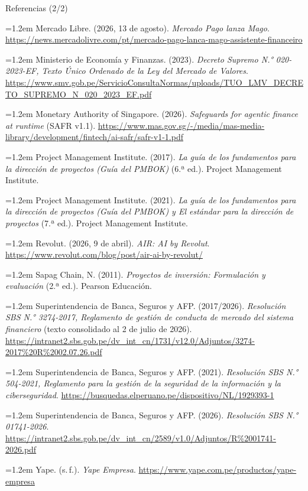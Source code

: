 \documentclass[aspectratio=169,11pt]{beamer}
\begin{document}
\begin{frame}{Referencias (2/2)}
\vspace{-0.05cm}
\tiny
\setlength{\parskip}{0.35em}
\raggedright
\hangindent=1.2em Mercado Libre. (2026, 13 de agosto). \textit{Mercado Pago lanza Mago}. \url{https://news.mercadolivre.com/pt/mercado-pago-lanca-mago-assistente-financeiro}\par
\hangindent=1.2em Ministerio de Economía y Finanzas. (2023). \textit{Decreto Supremo N.° 020-2023-EF, Texto Único Ordenado de la Ley del Mercado de Valores}. \url{https://www.smv.gob.pe/ServicioConsultaNormas/uploads/TUO_LMV_DECRETO_SUPREMO_N_020_2023_EF.pdf}\par
\hangindent=1.2em Monetary Authority of Singapore. (2026). \textit{Safeguards for agentic finance at runtime} (SAFR v1.1). \url{https://www.mas.gov.sg/-/media/mas-media-library/development/fintech/ai-safr/safr-v1-1.pdf}\par
\hangindent=1.2em Project Management Institute. (2017). \textit{La guía de los fundamentos para la dirección de proyectos (Guía del PMBOK)} (6.ª ed.). Project Management Institute.\par
\hangindent=1.2em Project Management Institute. (2021). \textit{La guía de los fundamentos para la dirección de proyectos (Guía del PMBOK) y El estándar para la dirección de proyectos} (7.ª ed.). Project Management Institute.\par
\hangindent=1.2em Revolut. (2026, 9 de abril). \textit{AIR: AI by Revolut}. \url{https://www.revolut.com/blog/post/air-ai-by-revolut/}\par
\hangindent=1.2em Sapag Chain, N. (2011). \textit{Proyectos de inversión: Formulación y evaluación} (2.ª ed.). Pearson Educación.\par
\hangindent=1.2em Superintendencia de Banca, Seguros y AFP. (2017/2026). \textit{Resolución SBS N.° 3274-2017, Reglamento de gestión de conducta de mercado del sistema financiero} (texto consolidado al 2 de julio de 2026). \url{https://intranet2.sbs.gob.pe/dv_int_cn/1731/v12.0/Adjuntos/3274-2017\%20R\%2002.07.26.pdf}\par
\hangindent=1.2em Superintendencia de Banca, Seguros y AFP. (2021). \textit{Resolución SBS N.° 504-2021, Reglamento para la gestión de la seguridad de la información y la ciberseguridad}. \url{https://busquedas.elperuano.pe/dispositivo/NL/1929393-1}\par
\hangindent=1.2em Superintendencia de Banca, Seguros y AFP. (2026). \textit{Resolución SBS N.° 01741-2026}. \url{https://intranet2.sbs.gob.pe/dv_int_cn/2589/v1.0/Adjuntos/R\%2001741-2026.pdf}\par
\hangindent=1.2em Yape. (s.\,f.). \textit{Yape Empresa}. \url{https://www.yape.com.pe/productos/yape-empresa}\par
\end{frame}
\end{document}

